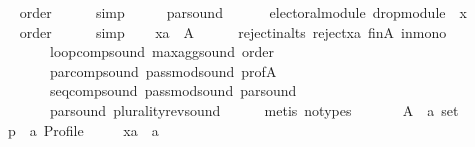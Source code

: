 \begin{isabellebody}
\ \ \ \ \isamarkupfalse%
\ order\isanewline
\ \ \ \ \isamarkupfalse%
\ simp\isanewline
\ \ \isamarkupfalse%
\ \isamarkupfalse%
\ par{}{\isacharunderscore}{\kern0pt}sound{\isacharcolon}{\kern0pt}\isanewline
\ \ \ \ \ \ {\isachardoublequoteopen}electoral{\isacharunderscore}{\kern0pt}module\ {\isacharparenleft}{\kern0pt}drop{\isacharunderscore}{\kern0pt}module\ {}\ x{\isacharparenright}{\kern0pt}{\isachardoublequoteclose}\isanewline
\ \ \ \ \isamarkupfalse%
\ order\isanewline
\ \ \ \ \isamarkupfalse%
\ simp\isanewline
\ \ \isamarkupfalse%
\ {\isachardoublequoteopen}xa\ {\isasymin}\ A{\isachardoublequoteclose}\isanewline
\ \ \ \ \isamarkupfalse%
\ reject{\isacharunderscore}{\kern0pt}in{\isacharunderscore}{\kern0pt}alts\ reject{\isacharunderscore}{\kern0pt}xa\ fin{\isacharunderscore}{\kern0pt}A\ in{\isacharunderscore}{\kern0pt}mono\isanewline
\ \ \ \ \ \ \ \ \ \ loop{\isacharunderscore}{\kern0pt}comp{\isacharunderscore}{\kern0pt}sound\ max{\isacharunderscore}{\kern0pt}agg{\isacharunderscore}{\kern0pt}sound\ order\isanewline
\ \ \ \ \ \ \ \ \ \ par{\isacharunderscore}{\kern0pt}comp{\isacharunderscore}{\kern0pt}sound\ pass{\isacharunderscore}{\kern0pt}mod{\isacharunderscore}{\kern0pt}sound\ prof{\isacharunderscore}{\kern0pt}A\isanewline
\ \ \ \ \ \ \ \ \ \ seq{\isacharunderscore}{\kern0pt}comp{\isacharunderscore}{\kern0pt}sound\ pass{\isacharunderscore}{\kern0pt}mod{\isacharunderscore}{\kern0pt}sound\ par{}{\isacharunderscore}{\kern0pt}sound\isanewline
\ \ \ \ \ \ \ \ \ \ par{}{\isacharunderscore}{\kern0pt}sound\ plurality{\isacharunderscore}{\kern0pt}rev{\isacharunderscore}{\kern0pt}sound\isanewline
\ \ \ \ \isamarkupfalse%
\ {\isacharparenleft}{\kern0pt}metis\ {\isacharparenleft}{\kern0pt}no{\isacharunderscore}{\kern0pt}types{\isacharparenright}{\kern0pt}{\isacharparenright}{\kern0pt}\isanewline
{}\isamarkupfalse%
\isanewline
\ \ \isamarkupfalse%
\isanewline
\ \ \ \ A\ {\isacharcolon}{\kern0pt}{\isacharcolon}{\kern0pt}\ {\isachardoublequoteopen}{\isacharprime}{\kern0pt}a\ set{\isachardoublequoteclose}\ \isanewline
\ \ \ \ p\ {\isacharcolon}{\kern0pt}{\isacharcolon}{\kern0pt}\ {\isachardoublequoteopen}{\isacharprime}{\kern0pt}a\ Profile{\isachardoublequoteclose}\ \isanewline
\ \ \ \ xa\ {\isacharcolon}{\kern0pt}{\isacharcolon}{\kern0pt}\ {\isachardoublequoteopen}{\isacharprime}{\kern0pt}a{\isachardoublequoteclose}\isanewline

\end{isabellebody}
